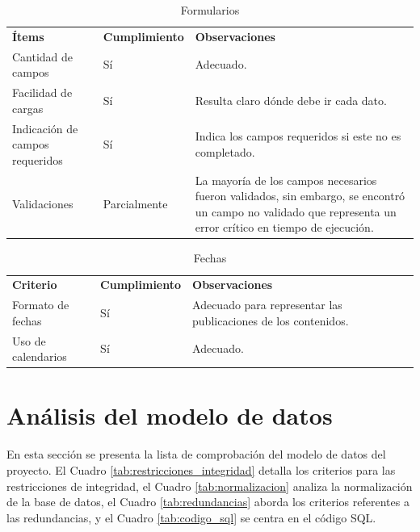 \documentclass[10pt,times,twocolumn]{article}
\begin{document}
\begin{table}[H]
    \centering
    \begin{tabular}{p{2cm}p{2cm}p{3cm}}
        \rowcolor{gray!15}
        \textbf{Ítems} & \textbf{Cumplimiento} & \textbf{Observaciones} \\
        Cantidad de campos & Sí & Adecuado. \\
       	Facilidad de cargas & Sí & Resulta claro dónde debe ir cada dato. \\
       	Indicación de campos requeridos & Sí & Indica los campos requeridos si este no es completado. \\
       	Validaciones & Parcialmente & La mayoría de los campos necesarios fueron validados, sin embargo, se encontró un campo no validado que representa un error crítico en tiempo de ejecución. \\
    \end{tabular}
    \caption{Formularios}
    \label{tab:formularios}
\end{table}

\begin{table}[H]
    \centering
    \begin{tabular}{p{2cm}p{2cm}p{3cm}}
        \rowcolor{gray!15}
        \textbf{Criterio} & \textbf{Cumplimiento} & \textbf{Observaciones} \\
        Formato de fechas & Sí & Adecuado para representar las publicaciones de los contenidos. \\
       Uso de calendarios & Sí & Adecuado. \\
    \end{tabular}
    \caption{Fechas}
    \label{tab:fechas}
\end{table}

\section{Análisis del modelo de datos}
En esta sección se presenta la lista de comprobación del modelo de datos del proyecto. El Cuadro \ref{tab:restricciones_integridad} detalla los criterios para las restricciones de integridad, el Cuadro \ref{tab:normalizacion} analiza la normalización de la base de datos, el Cuadro \ref{tab:redundancias} aborda los criterios referentes a las redundancias, y el Cuadro \ref{tab:codigo_sql} se centra en el código SQL.
\end{document}
